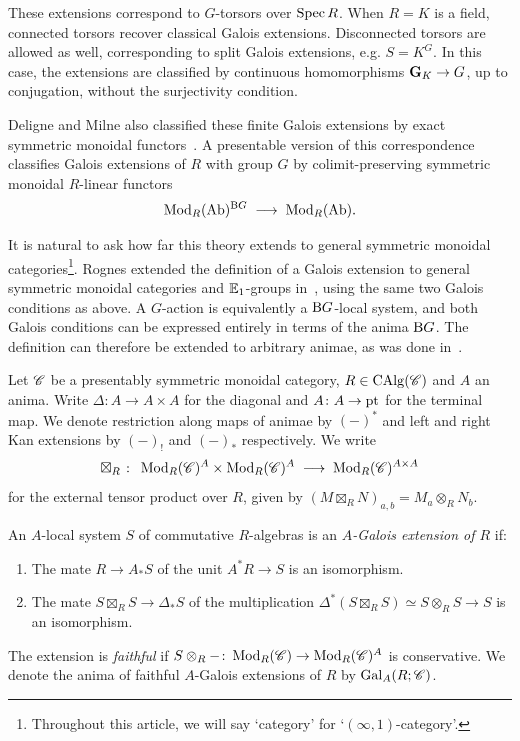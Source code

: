 \documentclass[english,svgnames,table]{article}
\begin{document}
These extensions correspond to $G$-torsors over $\operatorname{Spec} R$. When $R = K$ is a field, connected torsors recover classical Galois extensions. Disconnected torsors are allowed as well, corresponding to split Galois extensions, e.g. $S = K^G$.
In this case, the extensions are classified by continuous homomorphisms $\mathbf{G}_K \to G$, up to conjugation, without the surjectivity condition.

Deligne and Milne also classified these finite Galois extensions by exact symmetric monoidal functors~\cite[Theorem~3.2(b)]{Deligne-Milne-1982-Tannakian}.
A presentable version of this correspondence classifies Galois extensions of $R$ with group $G$ by colimit-preserving symmetric monoidal $R$-linear functors
\begin{equation*}
    \operatorname{Mod}_R(\mathrm{Ab})^{\mathrm{B} G} \;\longrightarrow\; \operatorname{Mod}_R(\mathrm{Ab}).
\end{equation*}


It is natural to ask how far this theory extends to general symmetric monoidal categories\footnote{Throughout this article, we will say `category' for `$(\infty,1)$-category'.}.
Rognes extended the definition of a Galois extension to general symmetric monoidal categories and $\mathbb{E}_1$-groups in~\cite{Rognes-2008-Galois}, using the same two Galois conditions as above.
A $G$-action is equivalently a $\mathrm{B} G$-local system, and both Galois conditions can be expressed entirely in terms of the anima $\mathrm{B} G$.
The definition can therefore be extended to arbitrary animae, as was done in~\cite{BCSY-Fourier}.

Let $\mathscr{C}$ be a presentably symmetric monoidal category, $R \in \operatorname{CAlg}(\mathscr{C})$ and $A$ an anima.
Write $\Delta \colon A \to A \times A$ for the diagonal and $A \colon A \to \mathrm{pt}$ for the terminal map.
We denote restriction along maps of animae by $(-)^*$ and left and right Kan extensions by $(-)_!$ and $(-)_*$ respectively.
We write 
\begin{equation*}
    \boxtimes_R \;\colon\; \operatorname{Mod}_R(\mathscr{C})^A \times \operatorname{Mod}_R(\mathscr{C})^A \;\longrightarrow\; \operatorname{Mod}_R(\mathscr{C})^{A \times A}
\end{equation*}
for the external tensor product over $R$, given by $(M \boxtimes_R N)_{a,b} = M_a \otimes_R N_b$.

\begin{definition}
\label{def:Galois}
    An $A$-local system $S$ of commutative $R$-algebras is an \emph{$A$-Galois extension of $R$} if:
    \begin{enumerate}[label=(G\arabic*), leftmargin=*]
        \item\label{cond:Galois-1}
        The mate $R \to A_* S$ of the unit $A^*R \to S$ is an isomorphism.
        \item\label{cond:Galois-2}
        The mate $S \boxtimes_R S \to \Delta_*S$ of the multiplication $\Delta^*(S \boxtimes_R S) \simeq S \otimes_R S \to S$ is an isomorphism.
    \end{enumerate}
    The extension is \emph{faithful} if $S \otimes_R - \colon \operatorname{Mod}_R(\mathscr{C}) \to \operatorname{Mod}_R(\mathscr{C})^A$ is conservative.
    We denote the anima of faithful $A$-Galois extensions of $R$ by $\mathrm{Gal}_A(R; \mathscr{C})$.
\end{definition}
\end{document}
